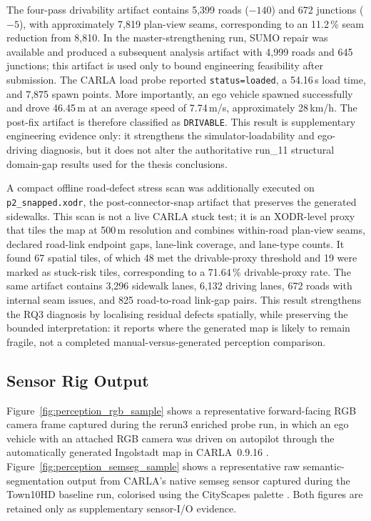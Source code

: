The four-pass drivability artifact contains 5,399 roads ($-140$) and 672 junctions ($-5$), with approximately 7,819 plan-view seams, corresponding to an 11.2\,\% seam reduction from 8,810. In the master-strengthening run, SUMO repair was available and produced a subsequent analysis artifact with 4,999 roads and 645 junctions; this artifact is used only to bound engineering feasibility after submission. The CARLA load probe reported \texttt{status=loaded}, a 54.16\,s load time, and 7,875 spawn points. More importantly, an ego vehicle spawned successfully and drove 46.45\,m at an average speed of 7.74\,m/s, approximately 28\,km/h. The post-fix artifact is therefore classified as \texttt{DRIVABLE}. This result is supplementary engineering evidence only: it strengthens the simulator-loadability and ego-driving diagnosis, but it does not alter the authoritative run\_11 structural domain-gap results used for the thesis conclusions.

A compact offline road-defect stress scan was additionally executed on \texttt{p2\_snapped.xodr}, the post-connector-snap artifact that preserves the generated sidewalks. This scan is not a live CARLA stuck test; it is an XODR-level proxy that tiles the map at 500\,m resolution and combines within-road plan-view seams, declared road-link endpoint gaps, lane-link coverage, and lane-type counts. It found 67 spatial tiles, of which 48 met the drivable-proxy threshold and 19 were marked as stuck-risk tiles, corresponding to a 71.64\,\% drivable-proxy rate. The same artifact contains 3,296 sidewalk lanes, 6,132 driving lanes, 672 roads with internal seam issues, and 825 road-to-road link-gap pairs. This result strengthens the RQ3 diagnosis by localising residual defects spatially, while preserving the bounded interpretation: it reports where the generated map is likely to remain fragile, not a completed manual-versus-generated perception comparison.

\subsection{Sensor Rig Output}
\label{sec:sensor_output_generated}

Figure~\ref{fig:perception_rgb_sample} shows a representative forward-facing RGB camera frame captured during the rerun3 enriched probe run, in which an ego vehicle with an attached RGB camera was driven on autopilot through the automatically generated Ingolstadt map in CARLA~0.9.16 \cite{carla_opendrive_standalone}. Figure~\ref{fig:perception_semseg_sample} shows a representative raw semantic-segmentation output from CARLA's native semseg sensor captured during the Town10HD baseline run, colorised using the CityScapes palette \cite{cordts2016cityscapes}. Both figures are retained only as supplementary sensor-I/O evidence.

